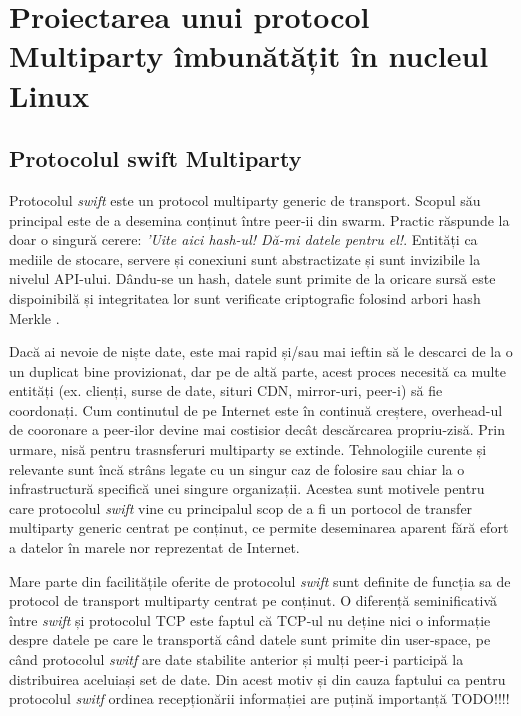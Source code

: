 
\chapter{Proiectarea unui protocol Multiparty îmbunătățit în nucleul Linux }
\label{chapter:multiparty}


\section{Protocolul swift Multiparty}
\label{sec:multiparty:swift}

Protocolul \textit{swift} este un protocol multiparty generic de transport.
Scopul său principal este de a desemina conținut între peer-ii din swarm.
Practic răspunde la doar o singură cerere: \textit{'Uite aici hash-ul!
Dă-mi datele pentru el!}. Entități ca mediile de stocare, servere și
conexiuni sunt abstractizate și sunt invizibile la nivelul API-ului.
Dându-se un hash, datele sunt primite de la oricare sursă este dispoinibilă
și integritatea lor sunt verificate criptografic folosind arbori hash
Merkle \cite{merkle}.



Dacă ai nevoie de niște date, este mai rapid și/sau mai ieftin să le
descarci de la o un duplicat bine provizionat, dar pe de altă parte, acest
proces necesită ca multe entități (ex. clienți, surse de date, situri CDN,
mirror-uri, peer-i) să fie coordonați. Cum continutul de pe Internet este
în continuă creștere, overhead-ul de cooronare a peer-ilor devine mai
costisior decât descărcarea propriu-zisă. Prin urmare, nisă pentru
trasnsferuri multiparty se extinde. Tehnologiile curente și relevante sunt
încă strâns legate cu un singur caz de folosire sau chiar la o
infrastructură specifică unei singure organizații. Acestea sunt motivele
pentru care protocolul \textit{swift} vine cu principalul scop de a fi un
portocol de transfer multiparty generic centrat pe conținut, ce permite
deseminarea aparent fără efort a datelor în marele nor reprezentat de
Internet.

Mare parte din facilitățile oferite de protocolul \textit{swift} sunt
definite de funcția sa de protocol de transport multiparty centrat pe
conținut. O diferență seminificativă între \textit{swift} și protocolul TCP
este faptul că TCP-ul nu deține nici o informație despre datele pe care le
transportă când datele sunt primite din user-space, pe când protocolul
\textit{switf} are date stabilite anterior și mulți peer-i participă la
distribuirea aceluiași set de date. Din acest motiv și din cauza faptului
ca pentru protocolul \textit{switf} ordinea recepționării informației are
puțină importanță 
TODO!!!!

